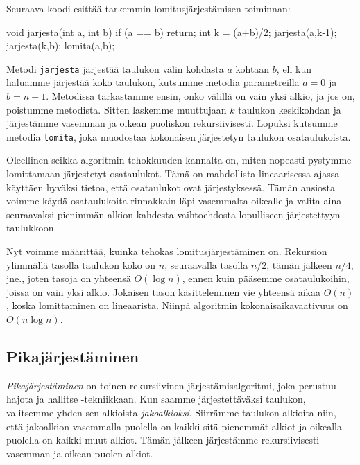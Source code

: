 Seuraava koodi esittää tarkemmin lomitusjärjestämisen toiminnan:

\begin{code}
void jarjesta(int a, int b) {
    if (a == b) return;
    int k = (a+b)/2;
    jarjesta(a,k-1);
    jarjesta(k,b);
    lomita(a,b);
}
\end{code}

Metodi \texttt{jarjesta} järjestää taulukon välin kohdasta
$a$ kohtaan $b$, eli kun haluamme järjestää koko taulukon,
kutsumme metodia parametreilla $a=0$ ja $b=n-1$.
Metodissa tarkastamme ensin, onko välillä on vain yksi alkio,
ja jos on, poistumme metodista.
Sitten laskemme muuttujaan $k$ taulukon keskikohdan
ja järjestämme vasemman ja oikean puoliskon rekursiivisesti.
Lopuksi kutsumme metodia \texttt{lomita},
joka muodostaa kokonaisen järjestetyn taulukon osataulukoista.

Oleellinen seikka algoritmin tehokkuuden kannalta on,
miten nopeasti pystymme lomittamaan järjestetyt osataulukot.
Tämä on mahdollista lineaarisessa ajassa käyttäen hyväksi tietoa,
että osataulukot ovat järjestyksessä.
Tämän ansiosta voimme käydä osataulukoita rinnakkain läpi
vasemmalta oikealle ja valita aina seuraavaksi pienimmän alkion
kahdesta vaihtoehdosta lopulliseen järjestettyyn taulukkoon.

Nyt voimme määrittää, kuinka tehokas lomitusjärjestäminen on.
Rekursion ylimmällä tasolla taulukon koko on $n$,
seuraavalla tasolla $n/2$, tämän jälkeen $n/4$, jne.,
joten tasoja on yhteensä $O(\log n)$, ennen kuin pääsemme
osataulukoihin, joissa on vain yksi alkio.
Jokaisen tason käsitteleminen vie yhteensä aikaa $O(n)$,
koska lomittaminen on lineaarista.
Niinpä algoritmin kokonaisaikavaativuus on $O(n \log n)$.

\subsection{Pikajärjestäminen}

\emph{Pikajärjestäminen} on toinen rekursiivinen järjestämisalgoritmi,
joka perustuu hajota ja hallitse -tekniikkaan.
Kun saamme järjestettäväksi taulukon, valitsemme yhden sen alkioista
\emph{jakoalkioksi}.
Siirrämme taulukon alkioita niin,
että jakoalkion vasemmalla puolella on kaikki sitä pienemmät alkiot
ja oikealla puolella on kaikki muut alkiot.
Tämän jälkeen järjestämme rekursiivisesti vasemman ja oikean puolen alkiot.

